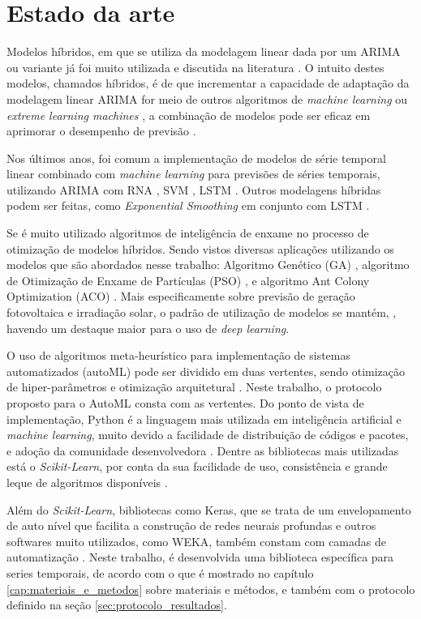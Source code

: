 \chapter{Estado da arte}
\label{cap:estado_da_arte}

Modelos híbridos, em que se utiliza da modelagem linear dada por um ARIMA ou variante já foi muito utilizada e discutida na literatura \cite{zhang2003time, khashei2010artificial, babu2014moving, de2014hybrid, de2016hybrid, domingos2019intelligent}. O intuito destes modelos, chamados híbridos, é de que incrementar a capacidade de adaptação da modelagem linear ARIMA for meio de outros algoritmos de \textit{machine learning} ou \textit{extreme learning machines} \cite{yu2020hybrid}, a combinação de modelos pode ser eficaz em aprimorar o desempenho de previsão \cite{khashei2012new}.

Nos últimos anos, foi comum a implementação de modelos de série temporal linear combinado com \textit{machine learning} para previsões de séries temporais, utilizando ARIMA com RNA \cite{xiong2017hybrid}, SVM \cite{domingos2019intelligent}, LSTM \cite{choi2018stock}. Outros modelagens híbridas podem ser feitas, como \textit{Exponential Smoothing} em conjunto com LSTM \cite{smyl2020hybrid}.

Se é muito utilizado algoritmos de inteligência de enxame no processo de otimização de modelos híbridos. Sendo vistos diversas aplicações utilizando os modelos que são abordados nesse trabalho: Algoritmo Genético (GA) \cite{huang2012hybrid}, algoritmo de Otimização de Enxame de Partículas (PSO) \cite{bagheri2014financial, pradeepkumar2017forecasting}, e algoritmo Ant Colony Optimization (ACO) \cite{shen2013optimal}. Mais especificamente sobre previsão de geração fotovoltaica e irradiação solar, o padrão de utilização de modelos se mantém, \cite{sobri2018solar, wang2019review}, havendo um destaque maior para o uso de \textit{deep learning}.

O uso de algoritmos meta-heurístico para implementação de sistemas automatizados (autoML) pode ser dividido em duas vertentes, sendo otimização de hiper-parâmetros e otimização arquitetural \cite{he2021automl}. Neste trabalho, o protocolo proposto para o AutoML consta com as vertentes. Do ponto de vista de implementação, Python é a linguagem mais utilizada em inteligência artificial e \textit{machine learning}, muito devido a facilidade de distribuição de códigos e pacotes, e adoção da comunidade desenvolvedora \cite{blank2020pymoo}. Dentre as bibliotecas mais utilizadas está o \textit{Scikit-Learn}, por conta da sua facilidade de uso, consistência e grande leque de algoritmos disponíveis \cite{scikit-learn, hackeling2017mastering}. 

Além do \textit{Scikit-Learn}, bibliotecas como Keras, que se trata de um envelopamento de auto nível que facilita a construção de redes neurais profundas \cite{jin2019auto} e outros softwares muito utilizados, como WEKA, também constam com camadas de automatização \cite{feurer2020auto}. Neste trabalho, é desenvolvida uma biblioteca específica para series temporais, de acordo com o que é mostrado no capítulo \ref{cap:materiais_e_metodos} sobre materiais e métodos, e também com o protocolo definido na seção \ref{sec:protocolo_resultados}.
